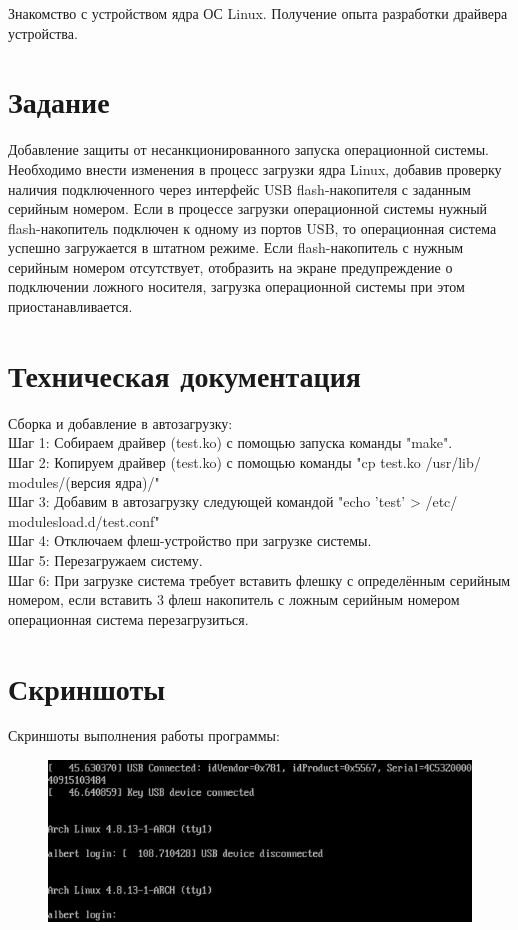 \documentclass[a4paper]{article}
\begin{document}
Знакомство с устройством ядра ОС Linux. Получение опыта разработки драйвера устройства.

\section{Задание}

Добавление защиты от несанкционированного запуска операционной системы. Необходимо внести изменения в процесс загрузки ядра Linux, добавив проверку наличия подключенного через интерфейс USB flash-накопителя с заданным серийным номером. Если в процессе загрузки операционной системы нужный flash-накопитель подключен к одному из портов USB, то операционная система успешно загружается в штатном режиме. Если flash-накопитель с нужным серийным номером отсутствует, отобразить на экране предупреждение о подключении ложного носителя, загрузка операционной системы при этом приостанавливается. 

\section{Техническая документация}


 Сборка и добавление в автозагрузку:\\ 
 Шаг 1: Собираем драйвер (test.ko) с помощью запуска команды "make".\\
 Шаг 2: Копируем драйвер (test.ko) с помощью команды "cp test.ko /usr/lib/ modules/(версия ядра)/"\\
 Шаг 3: Добавим в автозагрузку следующей командой "echo ’test’ > /etc/ modulesload.d/test.conf"\\
 Шаг 4: Отключаем флеш-устройство при загрузке системы.\\
 Шаг 5: Перезагружаем систему.\\
 Шаг 6: При загрузке система требует вставить флешку с определённым серийным номером, если вставить 3 флеш накопитель с ложным серийным номером операционная система перезагрузиться.\\
 
\section{Скриншоты}

Скриншоты выполнения работы программы:

\begin{figure}[h!]
\clearpage
\centering
\includegraphics[width=16cm]{ok.png} 
\caption{}
\end{figure}
\end{document}
